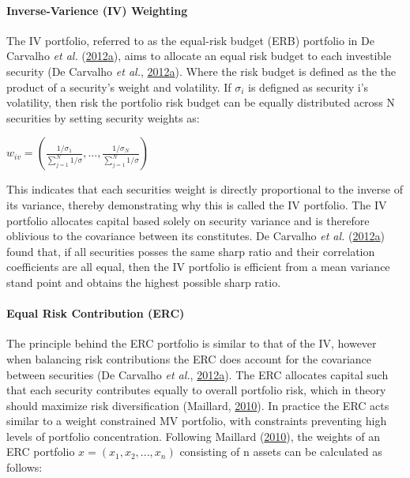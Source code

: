 \documentclass[11pt,preprint, authoryear]{elsarticle}
\numberwithin{equation}{section}
\numberwithin{figure}{section}
\numberwithin{table}{section}
\begin{document}
\hypertarget{inverse-varience-iv-weighting}{%
\paragraph{Inverse-Varience (IV)
Weighting}\label{inverse-varience-iv-weighting}}

The IV portfolio, referred to as the equal-risk budget (ERB) portfolio
in De Carvalho \emph{et al.}
(\protect\hyperlink{ref-leote}{2012}\protect\hyperlink{ref-leote}{a}),
aims to allocate an equal risk budget to each investible security (De
Carvalho \emph{et al.},
\protect\hyperlink{ref-leote}{2012}\protect\hyperlink{ref-leote}{a}).
Where the risk budget is defined as the the product of a security's
weight and volatility. If \(\sigma_i\) is defigned as security i's
volatility, then risk the portfolio risk budget can be equally
distributed across N securities by setting security weights as:

\begin{center} 
$w_{iv}=(\frac{1/\sigma_1}{\sum^N_{j=1} 1/\sigma}, ...,\frac{1/\sigma_N}{\sum^N_{j=1} 1/\sigma} )$ 
\end{center}

This indicates that each securities weight is directly proportional to
the inverse of its variance, thereby demonstrating why this is called
the IV portfolio. The IV portfolio allocates capital based solely on
security variance and is therefore oblivious to the covariance between
its constitutes. De Carvalho \emph{et al.}
(\protect\hyperlink{ref-leote}{2012}\protect\hyperlink{ref-leote}{a})
found that, if all securities posses the same sharp ratio and their
correlation coefficients are all equal, then the IV portfolio is
efficient from a mean variance stand point and obtains the highest
possible sharp ratio.

\hypertarget{equal-risk-contribution-erc}{%
\paragraph{Equal Risk Contribution
(ERC)}\label{equal-risk-contribution-erc}}

The principle behind the ERC portfolio is similar to that of the IV,
however when balancing risk contributions the ERC does account for the
covariance between securities (De Carvalho \emph{et al.},
\protect\hyperlink{ref-leote}{2012}\protect\hyperlink{ref-leote}{a}).
The ERC allocates capital such that each security contributes equally to
overall portfolio risk, which in theory should maximize risk
diversification (Maillard, \protect\hyperlink{ref-maillard2010}{2010}).
In practice the ERC acts similar to a weight constrained MV portfolio,
with constraints preventing high levels of portfolio concentration.
Following Maillard (\protect\hyperlink{ref-maillard2010}{2010}), the
weights of an ERC portfolio \(x=(x_1,x_2,...,x_n)\) consisting of n
assets can be calculated as follows:
\end{document}
